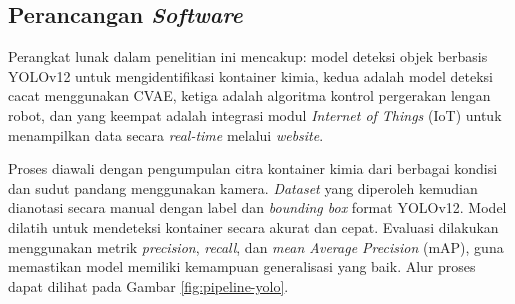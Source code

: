\vspace{1em}

\subsection{Perancangan \textit{Software}}
\noindent
Perangkat lunak dalam penelitian ini mencakup: model deteksi objek
berbasis YOLOv12 untuk mengidentifikasi kontainer kimia, kedua adalah
model deteksi cacat menggunakan CVAE, ketiga adalah algoritma kontrol
pergerakan lengan robot, dan yang keempat adalah integrasi modul
\textit{Internet of Things} (IoT) untuk menampilkan data secara
\textit{real-time} melalui \textit{website}.

Proses diawali dengan pengumpulan citra kontainer kimia dari berbagai
kondisi dan sudut pandang menggunakan kamera. \textit{Dataset} yang
diperoleh kemudian dianotasi secara manual dengan label dan
\textit{bounding box} format YOLOv12. Model dilatih untuk mendeteksi
kontainer secara akurat dan cepat. Evaluasi dilakukan menggunakan metrik
\textit{precision}, \textit{recall}, dan \textit{mean Average
Precision} (mAP), guna memastikan model memiliki kemampuan
generalisasi yang baik. Alur proses dapat dilihat pada Gambar
\ref{fig:pipeline-yolo}.


